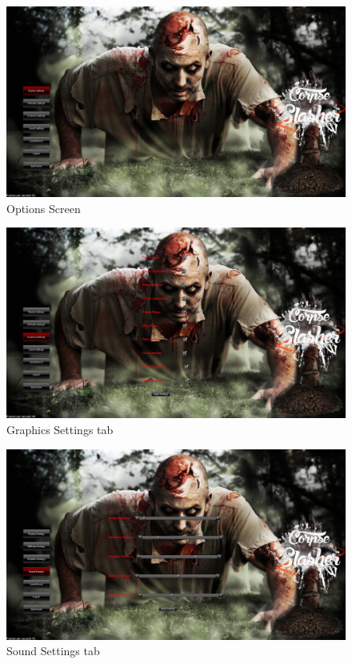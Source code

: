 \documentclass[letterpaper]{article}
\begin{document}
			
		\begin{figure}[H]
		\centering
		\includegraphics[width=130mm]{GUI_ScreenShots/OptionsScreen.jpg}
		\caption{Options Screen}
		\end{figure}
		
			
		\begin{figure}[H]
		\centering
		\includegraphics[width=130mm]{GUI_ScreenShots/GraphicsSettings.jpg}
		\caption{Graphics Settings tab}
		\end{figure}
		
			
		\begin{figure}[H]
		\centering
		\includegraphics[width=130mm]{GUI_ScreenShots/SoundSettings.jpg}
		\caption{Sound Settings tab}
		\end{figure}
		
\end{document}
